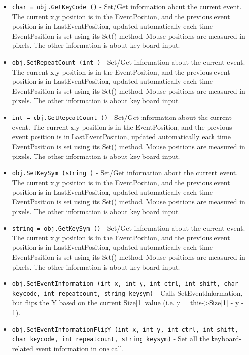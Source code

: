 \begin{itemize}
\item  \verb|char = obj.GetKeyCode ()| -  Set/Get information about the current event. 
 The current x,y position is in the EventPosition, and the previous
 event position is in LastEventPosition, updated automatically each
 time EventPosition is set using its Set() method. Mouse positions
 are measured in pixels.
 The other information is about key board input.

\item  \verb|obj.SetRepeatCount (int )| -  Set/Get information about the current event. 
 The current x,y position is in the EventPosition, and the previous
 event position is in LastEventPosition, updated automatically each
 time EventPosition is set using its Set() method. Mouse positions
 are measured in pixels.
 The other information is about key board input.

\item  \verb|int = obj.GetRepeatCount ()| -  Set/Get information about the current event. 
 The current x,y position is in the EventPosition, and the previous
 event position is in LastEventPosition, updated automatically each
 time EventPosition is set using its Set() method. Mouse positions
 are measured in pixels.
 The other information is about key board input.

\item  \verb|obj.SetKeySym (string )| -  Set/Get information about the current event. 
 The current x,y position is in the EventPosition, and the previous
 event position is in LastEventPosition, updated automatically each
 time EventPosition is set using its Set() method. Mouse positions
 are measured in pixels.
 The other information is about key board input.

\item  \verb|string = obj.GetKeySym ()| -  Set/Get information about the current event. 
 The current x,y position is in the EventPosition, and the previous
 event position is in LastEventPosition, updated automatically each
 time EventPosition is set using its Set() method. Mouse positions
 are measured in pixels.
 The other information is about key board input.

\item  \verb|obj.SetEventInformation (int x, int y, int ctrl, int shift, char keycode, int repeatcount, string keysym)| -  Calls SetEventInformation, but flips the Y based on the current Size[1] 
 value (i.e. y = this->Size[1] - y - 1).

\item  \verb|obj.SetEventInformationFlipY (int x, int y, int ctrl, int shift, char keycode, int repeatcount, string keysym)| -  Set all the keyboard-related event information in one call.


\end{itemize}
